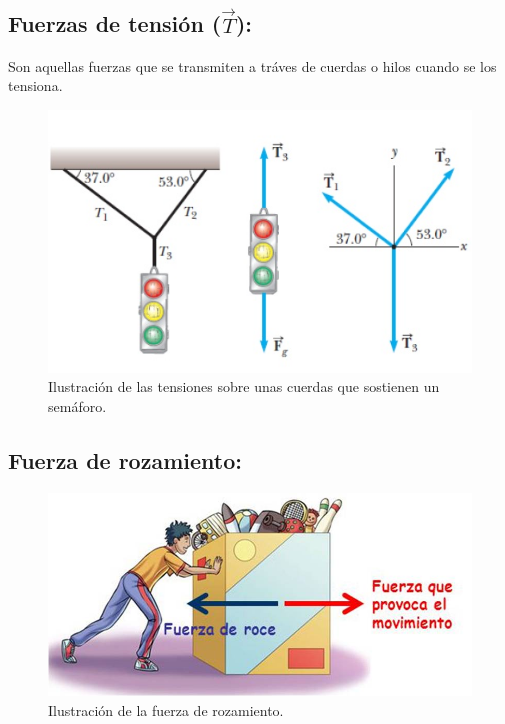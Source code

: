 \documentclass[a5paper,pagesize,10pt,bibtotoc,pointlessnumbers,
normalheadings,DIV=9,fleqn,x11names,table,twoside=false]{scrbook}
\begin{document}
\subsection{Fuerzas de tensión ($\vec{T}$):}

Son aquellas fuerzas que se transmiten a tráves de cuerdas o hilos cuando se los tensiona.

\begin{figure}[ht]
 \centering
 \includegraphics[scale=0.7]{images/tensiones.jpg}
 \caption{Ilustración de las tensiones sobre unas cuerdas que sostienen un semáforo.}\label{ac}
\end{figure}

\subsection{Fuerza de rozamiento:}

\begin{figure}[ht]
 \centering
 \includegraphics[scale=0.5]{images/fuerza-rozamiento.jpg}
 \caption{Ilustración de la fuerza de rozamiento.}\label{fr}
\end{figure}
\end{document}

